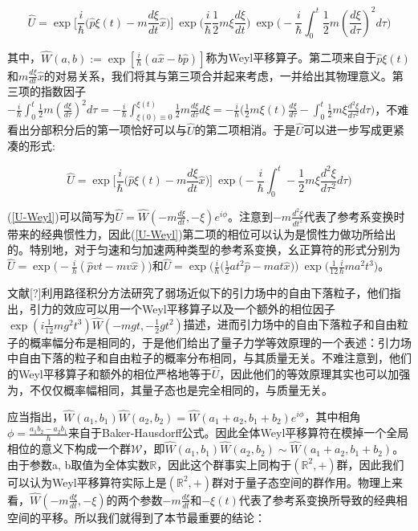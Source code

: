 \documentclass[a4paper]{article}
\begin{document}
        \begin{equation}
            \hat{U}=\exp\bigg[\frac{i}{\hbar}\bigg(\hat{p}\xi(t)-m\frac{d\xi}{dt}\hat{x} \bigg) \bigg]\ \exp\bigg(\frac{i}{\hbar}\frac{1}{2}m\xi\frac{d\xi}{dt} \bigg)\ \exp\bigg(-\frac{i}{\hbar}\int_0^t\frac{1}{2}m(\frac{d \xi}{d\tau})^2 d\tau \bigg)
        \end{equation}

        其中，$\hat{W}(a,b):=\exp[\frac{i}{\hbar}(a\hat{x}-b\hat{p})]$称为Weyl平移算子。第二项来自于$\hat{p}\xi(t)$和$m\frac{d\xi}{dt}\hat{x}$的对易关系，我们将其与第三项合并起来考虑，一并给出其物理意义。第三项的指数因子$-\frac{i}{\hbar}\int_0^t\frac{1}{2}m(\frac{d \xi}{d\tau})^2 d\tau = -\frac{i}{\hbar}\int_{\xi(0)\equiv 0}^{\xi(t)}\frac{1}{2}m\frac{d \xi}{d\tau} d\xi = -\frac{i}{\hbar}\bigg(\frac{1}{2}m\xi(t)\frac{d \xi}{d\tau}-\int_0^t\frac{1}{2}m\xi\frac{d^2\xi}{d\tau^2} d\tau\bigg)$，不难看出分部积分后的第一项恰好可以与$\hat{U}$的第二项相消。于是$\hat{U}$可以进一步写成更紧凑的形式:

        \begin{equation}\label{U-Weyl}
            \hat{U} = \exp\bigg[\frac{i}{\hbar}\bigg(\hat{p}\xi(t)-m\frac{d\xi}{dt}\hat{x} \bigg) \bigg]\ \exp\bigg( -\frac{i}{\hbar}\int_0^t-\frac{1}{2}m\xi\frac{d^2\xi}{d\tau^2} d\tau\bigg)
        \end{equation}

        (\ref{U-Weyl})可以简写为$\hat{U}=\hat{W}(-m\frac{d\xi}{dt},-\xi)e^{i\phi}$。注意到$-m\frac{d^2\xi}{dt^2}$代表了参考系变换时带来的经典惯性力，因此(\ref{U-Weyl})第二项的相位可以认为是惯性力做功所给出的。特别地，对于匀速和匀加速两种类型的参考系变换，幺正算符的形式分别为$\hat{U}=\exp\big(-\frac{i}{h}(\hat{p}vt-mv\hat{x})\big)$和$\hat{U}=\exp\big(\frac{i}{\hbar}\big(\frac{1}{2}at^2\hat{p}-mat\hat{x} \big)\big)\ \exp\big(\frac{1}{12}\frac{i}{\hbar}ma^2t^3\big)$。
        
        文献[?]利用路径积分方法研究了弱场近似下的引力场中的自由下落粒子，他们指出，引力的效应可以用一个Weyl平移算子以及一个额外的相位因子$\exp(i\frac{1}{12}mg^2t^3)\hat{W}(-mgt,-\frac{1}{2}gt^2)$描述，进而引力场中的自由下落粒子和自由粒子的概率幅分布是相同的，于是他们给出了量子力学等效原理的一个表述：引力场中自由下落的粒子和自由粒子的概率分布相同，与其质量无关。不难注意到，他们的Weyl平移算子和额外的相位严格地等于$\hat{U}$，因此他们的等效原理其实也可以加强为，不仅仅概率幅相同，其量子态也是完全相同的，与质量无关。

        应当指出，$\hat{W}(a_1, b_1)\hat{W}(a_2, b_2)=\hat{W}(a_1+a_2, b_1+b_2)e^{i\phi}$，其中相角$\phi=\frac{a_1b_2-a_2b_1}{\hbar}$来自于Baker-Hausdorff公式。因此全体Weyl平移算符在模掉一个全局相位的意义下构成一个群$\mathcal{W}$，即$\hat{W}(a_1, b_1)\hat{W}(a_2, b_2)\sim\hat{W}(a_1+a_2, b_1+b_2)$。由于参数a, b取值为全体实数$\mathbb{R}$，因此这个群事实上同构于$(\mathbb{R}^2,+)$群，因此我们可以认为Weyl平移算符实际上是$(\mathbb{R}^2,+)$群对于量子态空间的群作用。物理上来看，$\hat{W}(-m\frac{d\xi}{dt}, -\xi)$的两个参数$-m\frac{d\xi}{dt}$和$-\xi(t)$代表了参考系变换所导致的经典相空间的平移。所以我们就得到了本节最重要的结论：
\end{document}
